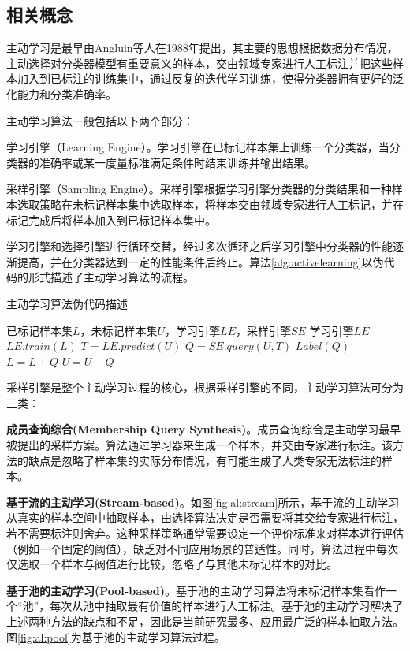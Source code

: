 \subsection{相关概念}
主动学习是最早由Angluin等人在1988年提出\cite{angluin1988queries}，其主要的思想根据数据分布情况，主动选择对分类器模型有重要意义的样本，交由领域专家进行人工标注并把这些样本加入到已标注的训练集中，通过反复的迭代学习训练，使得分类器拥有更好的泛化能力和分类准确率。

主动学习算法一般包括以下两个部分：
\begin{asparaenum}
\item 学习引擎（Learning Engine）。学习引擎在已标记样本集上训练一个分类器，当分类器的准确率或某一度量标准满足条件时结束训练并输出结果。
\item 采样引擎（Sampling Engine）。采样引擎根据学习引擎分类器的分类结果和一种样本选取策略在未标记样本集中选取样本，将样本交由领域专家进行人工标记，并在标记完成后将样本加入到已标记样本集中。
\end{asparaenum}

学习引擎和选择引擎进行循环交替，经过多次循环之后学习引擎中分类器的性能逐渐提高，并在分类器达到一定的性能条件后终止。算法\ref{alg:activelearning}以伪代码的形式描述了主动学习算法的流程。

\begin{algorithm}[!ht]
\caption{主动学习算法伪代码描述}
\label{alg:activelearning}
\begin{algorithmic}[1]
\Input 已标记样本集$L$，未标记样本集$U$，学习引擎$LE$，采样引擎$SE$
\Output 学习引擎$LE$
\Repeat
\State $LE.train(L)$
\State $T=LE.predict(U)$\Comment{}
\State $Q=SE.query(U, T)$
\State $Label(Q)$
\State $L=L+Q$
\State $U=U-Q$
\end{algorithmic}
\end{algorithm}

采样引擎是整个主动学习过程的核心，根据采样引擎的不同，主动学习算法可分为三类：
\begin{asparaenum}
\item \textbf{成员查询综合(Membership Query Synthesis)}。成员查询综合是主动学习最早被提出的采样方案\cite{angluin1988queries}。算法通过学习器来生成一个样本，并交由专家进行标注。该方法的缺点是忽略了样本集的实际分布情况，有可能生成了人类专家无法标注的样本。
\item \textbf{基于流的主动学习(Stream-based)}。如图\ref{fig:al:stream}所示，基于流的主动学习从真实的样本空间中抽取样本，由选择算法决定是否需要将其交给专家进行标注，若不需要标注则舍弃。这种采样策略通常需要设定一个评价标准来对样本进行评估（例如一个固定的阈值），缺乏对不同应用场景的普适性。同时，算法过程中每次仅选取一个样本与阀值进行比较，忽略了与其他未标记样本的对比。
\item \textbf{基于池的主动学习(Pool-based)}。基于池的主动学习算法将未标记样本集看作一个``池''，每次从池中抽取最有价值的样本进行人工标注。基于池的主动学习解决了上述两种方法的缺点和不足，因此是当前研究最多、应用最广泛的样本抽取方法。图\ref{fig:al:pool}为基于池的主动学习算法过程。
\end{asparaenum}

